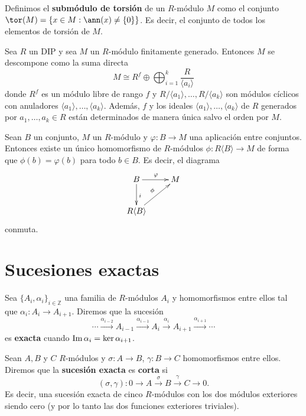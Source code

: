 \begin{definicion}
	Definimos el \textbf{submódulo de torsión} de un \( R \)-módulo \( M \) como el conjunto \( \tor(M)= \{x \in M : \ann(x) \neq \{0\}\} \). Es decir, el conjunto de todos los elementos de torsión de \( M \).
\end{definicion}
\begin{teorema}
	Sea $R$ un DIP y sea $M$ un $R$-módulo finitamente generado. Entonces $M$ se descompone como la suma directa
	\[
		M \cong R^f \oplus \bigoplus_{i = 1}^k \frac{R}{\langle a_i \rangle}
	\]
	donde $R^f$ es un módulo libre de rango $f$ y $R/\langle a_1 \rangle, \dots,
		R/\langle a_k \rangle$ son módulos cíclicos con anuladores $\langle a_1
		\rangle, \dots, \langle a_k \rangle$. Además, $f$ y los ideales $\langle a_1
		\rangle, \dots, \langle a_k \rangle$ de $R$ generados por $a_1, \dots, a_k \in
		R$ están determinados de manera única salvo el orden por $M$.
\end{teorema}
\begin{teorema}
	\label{teo:univ-prop-free-mod}
	Sean $B$ un conjunto, $M$ un $R$-módulo y $\varphi : B \to M$ una aplicación entre conjuntos. Entonces existe un único homomorfismo de $R$-módulos $\phi : R \langle B \rangle \to M$ de forma que $\phi(b) = \varphi(b)$ para todo $b \in B$. Es decir, el diagrama
	\[
		\xymatrix{
			B \ar@{->}[r]^{\varphi} \ar@{->}[d]^{i} & M \\
			R \langle B \rangle \ar@{->}[ru]^{\phi} & 
		}
	\]
	conmuta.
\end{teorema}

\section{Sucesiones exactas}

\begin{definicion}
	Sea $\{A_i, \alpha_i\}_{i \in \mathbb{Z}}$ una familia de $R$-módulos $A_i$ y homomorfismos entre ellos tal que $\alpha_i: A_i \rightarrow A_{i+1}$. Diremos que la sucesión
	\[ \cdots \xrightarrow{\alpha_{i-2}} A_{i-1} \xrightarrow{\alpha_{i-1}} A_i \xrightarrow{\alpha_{i}} A_{i+1} \xrightarrow{\alpha_{i+1}} \cdots \]
	es \textbf{exacta} cuando $\operatorname{Im} \alpha_i = \ker \alpha_{i+1}$.
\end{definicion}

\begin{definicion}
	Sean $A,B$ y $C$ $R$-módulos y $\sigma: A \rightarrow B$, $\gamma: B \rightarrow C$ homomorfismos entre ellos. Diremos que la \textbf{sucesión exacta} es \textbf{corta} si
	\[ (\sigma, \gamma): 0 \rightarrow A \xrightarrow{\sigma} B \xrightarrow{\gamma} C \rightarrow 0. \]
	Es decir, una sucesión exacta de cinco \(R\)-módulos con los dos módulos
	exteriores siendo cero (y por lo tanto las dos funciones exteriores triviales).
\end{definicion}

